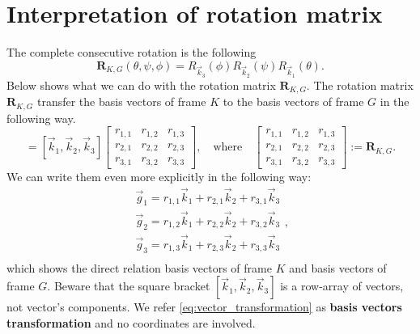 \documentclass{article}
\newcommand{\mat}[1]{\mathbf{#1}}
\newcommand{\MR}{\mat{R}}
\begin{document}
\section{Interpretation of rotation matrix}
The complete consecutive rotation is the following
\begin{equation}
\MR_{K,G} (\theta, \psi, \phi) = R_{\vec{k}_3}(\phi)R_{\vec{k}_2}(\psi)R_{\vec{k}_1}(\theta).
\label{eq:rotation_compose}
\end{equation}
Below shows what we can do with the rotation matrix $\MR_{K,G}$. The rotation matrix $\MR_{K,G}$ transfer the basis vectors of frame $K$ to the basis vectors of frame $G$ in the following way.
\begin{equation}
    [\vec{g}_1, \vec{g}_2, \vec{g}_3] = [\vec{k}_1, \vec{k}_2, \vec{k}_3]
    \begin{bmatrix}
      r_{1,1} & r_{1,2} & r_{1,3} \\
      r_{2,1} & r_{2,2} & r_{2,3} \\
      r_{3,1} & r_{3,2} & r_{3,3}
    \end{bmatrix},
    \quad \textrm{where} \quad
    \begin{bmatrix}
      r_{1,1} & r_{1,2} & r_{1,3} \\
      r_{2,1} & r_{2,2} & r_{2,3} \\
      r_{3,1} & r_{3,2} & r_{3,3}
    \end{bmatrix}
    := \MR_{K,G}.
    \label{eq:vector_transformation}
\end{equation}
We can write them even more explicitly in the following way:
\begin{equation*}
    \begin{array}{l} 
      \vec{g}_1= r_{1,1}\vec{k}_1 + r_{2,1}\vec{k}_2 + r_{3,1}\vec{k}_3\\
      \vec{g}_2= r_{1,2}\vec{k}_1 + r_{2,2}\vec{k}_2 + r_{3,2}\vec{k}_3\\
      \vec{g}_3= r_{1,3}\vec{k}_1 + r_{2,3}\vec{k}_2 + r_{3,3}\vec{k}_3\\
    \end{array},
\end{equation*}
which shows the direct relation basis vectors of frame $K$ and basis vectors of frame $G$. Beware that the square bracket $[\vec{k}_1, \vec{k}_2, \vec{k}_3]$ is a row-array of vectors, not vector's components. We refer \cref{eq:vector_transformation} as \textbf{basis vectors transformation} and no coordinates are involved.
\end{document}
